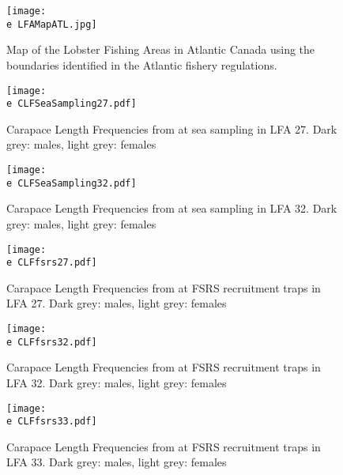 \documentclass[11pt]{article}
\newcommand{\e}{\string~/bio.data/bio.lobster/figures/LFA2733Framework2018/} %
\begin{document}
\begin{landscape}
\begin{figure}
\centering
    \texttt{[image: \\e LFAMapATL.jpg]}
    \caption{Map of the Lobster Fishing Areas in Atlantic Canada using the boundaries identified in the Atlantic fishery regulations.}

\end{figure}
\end{landscape}


\begin{figure}
\centering
    \texttt{[image: \\e CLFSeaSampling27.pdf]}
    \caption{Carapace Length Frequencies from at sea sampling in LFA 27. Dark grey: males, light grey: females}

\end{figure}

\begin{figure}
\centering
    \texttt{[image: \\e CLFSeaSampling32.pdf]}
    \caption{Carapace Length Frequencies from at sea sampling in LFA 32. Dark grey: males, light grey: females}

\end{figure}



\begin{figure}
\centering
    \texttt{[image: \\e CLFfsrs27.pdf]}
    \caption{Carapace Length Frequencies from at FSRS recruitment traps in LFA 27. Dark grey: males, light grey: females}

\end{figure}


\begin{figure}
\centering
    \texttt{[image: \\e CLFfsrs32.pdf]}
    \caption{Carapace Length Frequencies from at FSRS recruitment traps in LFA 32. Dark grey: males, light grey: females}

\end{figure}


\begin{figure}
\centering
    \texttt{[image: \\e CLFfsrs33.pdf]}
    \caption{Carapace Length Frequencies from at FSRS recruitment traps in LFA 33. Dark grey: males, light grey: females}

\end{figure}
\end{document}
